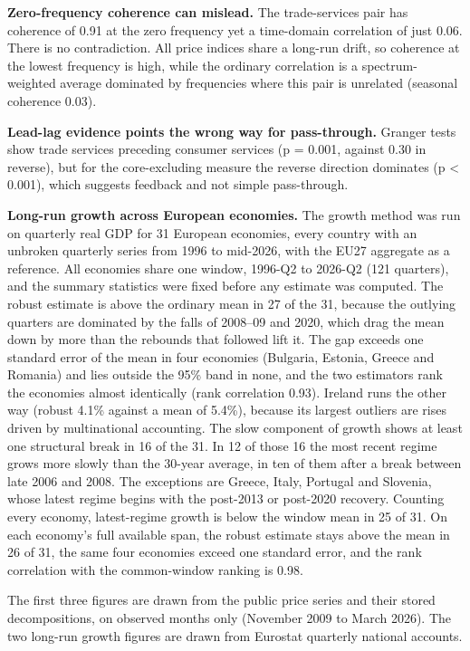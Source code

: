 \documentclass[
  british,
  a4paper,
]{article}
\newcounter{none} %
\begin{document}
\textbf{Zero-frequency coherence can mislead.} The trade-services pair
has coherence of 0.91 at the zero frequency yet a time-domain
correlation of just 0.06. There is no contradiction. All price indices
share a long-run drift, so coherence at the lowest frequency is high,
while the ordinary correlation is a spectrum-weighted average dominated
by frequencies where this pair is unrelated (seasonal coherence 0.03).

\textbf{Lead-lag evidence points the wrong way for pass-through.}
Granger tests show trade services preceding consumer services (p =
0.001, against 0.30 in reverse), but for the core-excluding measure the
reverse direction dominates (p \textless{} 0.001), which suggests
feedback and not simple pass-through.

\textbf{Long-run growth across European economies.} The growth method
was run on quarterly real GDP for 31 European economies, every country
with an unbroken quarterly series from 1996 to mid-2026, with the EU27
aggregate as a reference. All economies share one window, 1996-Q2 to
2026-Q2 (121 quarters), and the summary statistics were fixed before any
estimate was computed. The robust estimate is above the ordinary mean in
27 of the 31, because the outlying quarters are dominated by the falls
of 2008--09 and 2020, which drag the mean down by more than the rebounds
that followed lift it. The gap exceeds one standard error of the mean in
four economies (Bulgaria, Estonia, Greece and Romania) and lies outside
the 95\% band in none, and the two estimators rank the economies almost
identically (rank correlation 0.93). Ireland runs the other way (robust
4.1\% against a mean of 5.4\%), because its largest outliers are rises
driven by multinational accounting. The slow component of growth shows
at least one structural break in 16 of the 31. In 12 of those 16 the
most recent regime grows more slowly than the 30-year average, in ten of
them after a break between late 2006 and 2008. The exceptions are
Greece, Italy, Portugal and Slovenia, whose latest regime begins with
the post-2013 or post-2020 recovery. Counting every economy,
latest-regime growth is below the window mean in 25 of 31. On each
economy's full available span, the robust estimate stays above the mean
in 26 of 31, the same four economies exceed one standard error, and the
rank correlation with the common-window ranking is 0.98.

The first three figures are drawn from the public price series and their
stored decompositions, on observed months only (November 2009 to March
2026). The two long-run growth figures are drawn from Eurostat quarterly
national accounts.
\end{document}
